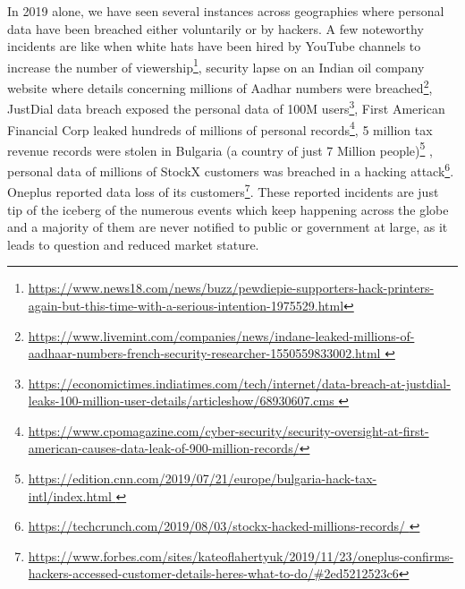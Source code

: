\begin{multicols}{2}
In 2019 alone, we have seen several instances across geographies where personal data have been breached either voluntarily or by hackers. A few noteworthy incidents are like when white hats have been hired by YouTube channels to increase the number of viewership\footnote{\url{https://www.news18.com/news/buzz/pewdiepie-supporters-hack-printers-again-but-this-time-with-a-serious-intention-1975529.html}}, security lapse on an Indian oil company website where details concerning millions of Aadhar numbers were breached\footnote{\url{https://www.livemint.com/companies/news/indane-leaked-millions-of-aadhaar-numbers-french-security-researcher-1550559833002.html
}}, JustDial data breach exposed the personal data of 100M users\footnote{\url{https://economictimes.indiatimes.com/tech/internet/data-breach-at-justdial-leaks-100-million-user-details/articleshow/68930607.cms
}}, First American Financial Corp leaked hundreds of millions of personal records\footnote{\url{https://www.cpomagazine.com/cyber-security/security-oversight-at-first-american-causes-data-leak-of-900-million-records/}}, 5 million tax revenue records were stolen in Bulgaria (a country of just 7 Million people)\footnote{\url{https://edition.cnn.com/2019/07/21/europe/bulgaria-hack-tax-intl/index.html
}} , personal data of millions of StockX customers was breached in a hacking attack\footnote{\url{https://techcrunch.com/2019/08/03/stockx-hacked-millions-records/
}}. Oneplus reported data loss of its customers\footnote{\url{https://www.forbes.com/sites/kateoflahertyuk/2019/11/23/oneplus-confirms-hackers-accessed-customer-details-heres-what-to-do/\#2ed5212523c6}}. These reported incidents are just tip of the iceberg of the numerous events which keep happening across the globe and a majority of them are never notified to public or government at large, as it leads to question and reduced market stature.  


\end{multicols}
